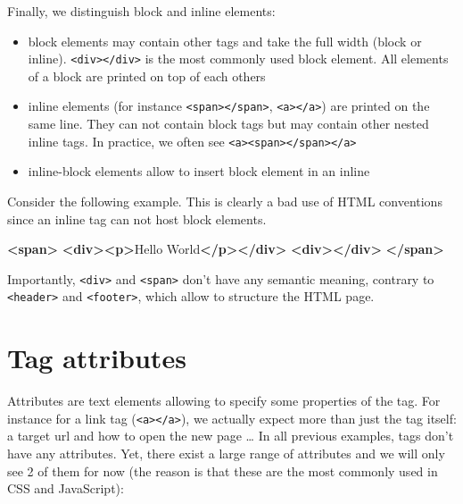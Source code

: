 \documentclass[]{book}
\newenvironment{Shaded}{\begin{snugshade}}{\end{snugshade}}
\newcommand{\KeywordTok}[1]{\textcolor[rgb]{0.13,0.29,0.53}{\textbf{#1}}}
\newcommand{\NormalTok}[1]{#1}
\providecommand{\tightlist}{%
  \setlength{\itemsep}{0pt}\setlength{\parskip}{0pt}}
\begin{document}
Finally, we distinguish block and inline elements:

\begin{itemize}
\tightlist
\item
  block elements may contain other tags and take the full width (block or inline). \texttt{\textless{}div\textgreater{}\textless{}/div\textgreater{}} is the most commonly used block element. All elements of a block are printed on top of each others
\item
  inline elements (for instance \texttt{\textless{}span\textgreater{}\textless{}/span\textgreater{}}, \texttt{\textless{}a\textgreater{}\textless{}/a\textgreater{}}) are printed on the same line. They can not contain block tags but may contain other nested inline tags. In practice, we often see \texttt{\textless{}a\textgreater{}\textless{}span\textgreater{}\textless{}/span\textgreater{}\textless{}/a\textgreater{}}
\item
  inline-block elements allow to insert block element in an inline
\end{itemize}

Consider the following example. This is clearly a bad use of HTML conventions since an inline tag can not host block elements.

\begin{Shaded}
\begin{Highlighting}[]
\KeywordTok{<span>}
  \KeywordTok{<div><p>}\NormalTok{Hello World}\KeywordTok{</p></div>}
  \KeywordTok{<div></div>}
\KeywordTok{</span>}
\end{Highlighting}
\end{Shaded}

Importantly, \texttt{\textless{}div\textgreater{}} and \texttt{\textless{}span\textgreater{}} don't have any semantic meaning, contrary to \texttt{\textless{}header\textgreater{}} and \texttt{\textless{}footer\textgreater{}}, which allow to structure the HTML page.

\hypertarget{tag-attributes}{%
\section{Tag attributes}\label{tag-attributes}}

Attributes are text elements allowing to specify some properties of the tag. For instance for a link tag (\texttt{\textless{}a\textgreater{}\textless{}/a\textgreater{}}), we actually expect more than just the tag itself: a target url and how to open the new page \ldots{} In all previous examples, tags don't have any attributes. Yet, there exist a large range of attributes and we will only see 2 of them for now (the reason is that these are the most commonly used in CSS and JavaScript):
\end{document}
